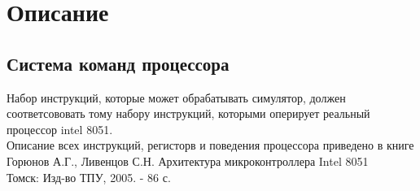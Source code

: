 \section{Описание}

\subsection{Система команд процессора}
Набор инструкций, которые может обрабатывать симулятор, должен соответсововать тому набору инструкций, которыми оперирует реальный процессор intel 8051.\\
Описание всех инструкций, регисторв и поведения процессора приведено в книге \\[5mm]
Горюнов А.Г., Ливенцов С.Н. Архитектура микроконтроллера Intel 8051 \\
Томск: Изд-во ТПУ, 2005. - 86 с. \\

